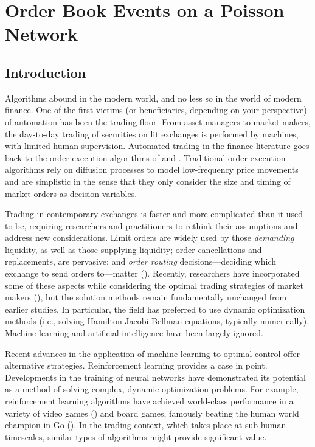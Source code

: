 \chapter{Order Book Events on a Poisson Network}
\label{chapter:four}


\section{Introduction}
	Algorithms abound in the modern world, and no less so in the world of modern finance. One of the first victims (or beneficiaries, depending on your perspective) of automation has been the trading floor. From asset managers to market makers, the day-to-day trading of securities on lit exchanges is performed by machines, with limited human supervision. Automated trading in the finance literature goes back to the order execution algorithms of \cite{Almgren2000} and \cite{Bertsimas1998}. Traditional order execution algorithms rely on diffusion processes to model low-frequency price movements and are simplistic in the sense that they only consider the size and timing of market orders as decision variables.

	Trading in contemporary exchanges is faster and more complicated than it used to be, requiring researchers and practitioners to rethink their assumptions and address new considerations. Limit orders are widely used by those \textit{demanding} liquidity, as well as those supplying liquidity; order cancellations and replacements, are pervasive; and \textit{order routing} decisions---deciding which exchange to send orders to---matter (\cite{Cont2017}). Recently, researchers have incorporated some of these aspects while considering the optimal trading strategies of market makers (\cite{Guilbaud2013, Xu2015}), but the solution methods remain fundamentally unchanged from earlier studies. In particular, the field has preferred to use dynamic optimization methods (i.e., solving Hamilton-Jacobi-Bellman equations, typically numerically). Machine learning and artificial intelligence have been largely ignored.

	Recent advances in the application of machine learning to optimal control offer alternative strategies. Reinforcement learning provides a case in point. Developments in the training of neural networks have demonstrated its potential as a method of solving complex, dynamic optimization problems. For example, reinforcement learning algorithms have achieved world-class performance in a variety of video games (\cite{Mnih2015}) and board games, famously beating the human world champion in Go (\cite{Silver2017}). In the trading context, which takes place at sub-human timescales, similar types of algorithms might provide significant value.

